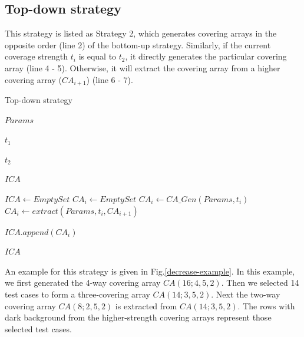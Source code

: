 \documentclass[conference]{IEEEtran}
\theoremstyle{definition}
\begin{document}
\subsection{Top-down strategy}
This strategy is listed as Strategy 2, which generates covering arrays in the opposite order (line 2) of the bottom-up strategy. Similarly, if the current coverage strength $t_{i}$ is equal to $t_{2}$, it directly generates the particular covering array (line 4 - 5). Otherwise, it will extract the covering array from a higher covering array ($CA_{i + 1}$) (line 6 - 7).




%
\begin{algorithm}
  \caption{Top-down strategy}
  \begin{algorithmic}[1]
    \Require
     $Params$ 

     $t_{1}$ 

     $t_{2}$ 

     \Ensure  $ICA$ 

      \State $ICA \leftarrow Empty Set$
         \State $CA_{i} \leftarrow  Empty Set $
                \State $CA_{i} \leftarrow CA\_Gen(Params, t_{i})$
         \Else
              \State $CA_{i} \leftarrow  extract(Params, t_{i}, CA_{i + 1})$
        \EndIf

        \State $ICA.append(CA_{i})$
      \EndFor

     \State \Return $ICA$
  \end{algorithmic}
\end{algorithm}

An example for this strategy is given in Fig.\ref{decrease-example}. In this example, we first generated the 4-way covering array $CA(16; 4, 5, 2)$. Then we selected 14 test cases to form a three-covering array $CA(14; 3, 5, 2)$. Next the two-way covering array $CA(8; 2, 5, 2)$ is extracted from $CA(14; 3, 5, 2)$. The rows with dark background from the higher-strength covering arrays represent those selected test cases.
\end{document}

